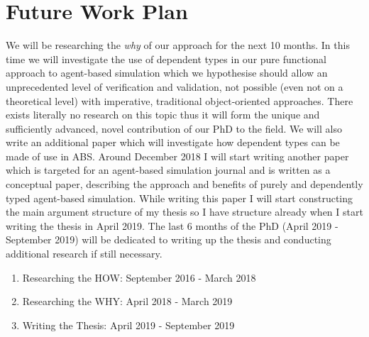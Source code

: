 \chapter{Future Work Plan}
\label{chap:future}

We will be researching the \textit{why} of our approach for the next 10 months. In this time we will investigate the use of dependent types in our pure functional approach to agent-based simulation which we hypothesise should allow an unprecedented level of verification and validation, not possible (even not on a theoretical level) with imperative, traditional object-oriented approaches. There exists literally no research on this topic thus it will form the unique and sufficiently advanced, novel contribution of our PhD to the field. We will also write an additional paper which will investigate how dependent types can be made of use in ABS.
Around December 2018 I will start writing another paper which is targeted for an agent-based simulation journal and is written as a conceptual paper, describing the approach and benefits of purely and dependently typed agent-based simulation. While writing this paper I will start constructing the main argument structure of my thesis so I have structure already when I start writing the thesis in April 2019. The last 6 months of the PhD (April 2019 - September 2019) will be dedicated to writing up the thesis and conducting additional research if still necessary.

\begin{enumerate}
	\item Researching the HOW: September 2016 - March 2018
	\item Researching the WHY: April 2018 - March 2019
	\item Writing the Thesis: April 2019 - September 2019
\end{enumerate}

%
%
%
%


